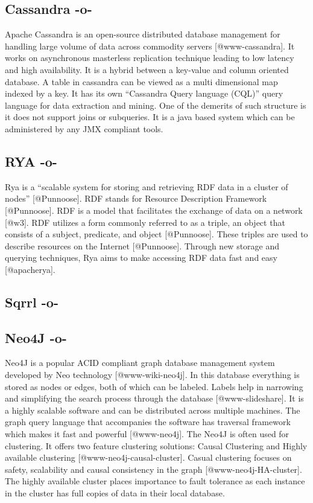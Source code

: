 \subsection{Cassandra -o-}

Apache Cassandra is an open-source distributed database management for
handling large volume of data across commodity
servers [@www-cassandra]. It works on asynchronous masterless
replication technique leading to low latency and high availability. It
is a hybrid between a key-value and column oriented database. A table
in cassandra can be viewed as a multi dimensional map indexed by a
key. It has its own ``Cassandra Query language (CQL)'' query language
for data extraction and mining. One of the demerits of such structure
is it does not support joins or subqueries. It is a java based system
which can be administered by any JMX compliant tools.



\subsection{RYA -o-}

Rya is a ``scalable system for storing and retrieving RDF data in a
cluster of nodes'' [@Punnoose]. RDF stands for Resource
Description Framework [@Punnoose]. RDF is a model that facilitates
the exchange of data on a network [@w3]. RDF utilizes a form
commonly referred to as a triple, an object that consists of a
subject, predicate, and object [@Punnoose].  These triples are
used to describe resources on the Internet [@Punnoose]. Through
new storage and querying techniques, Rya aims to make accessing RDF
data fast and easy [@apacherya].


     
\subsection{Sqrrl -o-}



\subsection{Neo4J -o-}

Neo4J is a popular ACID compliant graph database management system
developed by Neo technology [@www-wiki-neo4j].  In this database
everything is stored as nodes or edges, both of which can be
labeled. Labels help in narrowing and simplifying the search process
through the database [@www-slideshare]. It is a highly scalable
software and can be distributed across multiple machines.  The graph
query language that accompanies the software has traversal framework
which makes it fast and powerful [@www-neo4j]. The Neo4J is often
used for clustering. It offers two feature clustering solutions:
Causal Clustering and Highly available
clustering [@www-neo4j-causal-cluster]. Casual clustering focuses
on safety, scalability and causal consistency in the
graph [@www-neo4j-HA-cluster]. The highly available cluster places
importance to fault tolerance as each instance in the cluster has full
copies of data in their local database.



